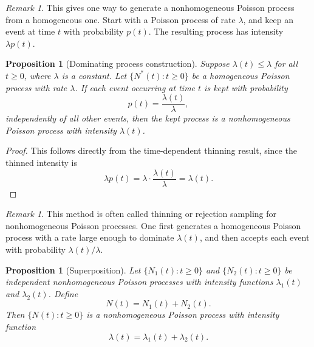 \documentclass[11pt]{article}
\theoremstyle{plain}
\newtheorem{proposition}[theorem]{Proposition}
\theoremstyle{definition}
\theoremstyle{remark}
\newtheorem{remark}[theorem]{Remark}
\begin{document}
	
	\begin{remark}
		This gives one way to generate a nonhomogeneous Poisson process from a homogeneous one. Start with a Poisson process of rate \(\lambda\), and keep an event at time \(t\) with probability \(p(t)\). The resulting process has intensity \(\lambda p(t)\).
	\end{remark}
	
	\begin{proposition}[Dominating process construction]
		Suppose \(\lambda(t)\le \lambda\) for all \(t\ge 0\), where \(\lambda\) is a constant. Let \(\{N^*(t):t\ge 0\}\) be a homogeneous Poisson process with rate \(\lambda\). If each event occurring at time \(t\) is kept with probability
		\[
		p(t)=\frac{\lambda(t)}{\lambda},
		\]
		independently of all other events, then the kept process is a nonhomogeneous Poisson process with intensity \(\lambda(t)\).
	\end{proposition}
	
	\begin{proof}
		This follows directly from the time-dependent thinning result, since the thinned intensity is
		\[
		\lambda p(t)=\lambda\cdot \frac{\lambda(t)}{\lambda}=\lambda(t).
		\]
	\end{proof}
	
	\begin{remark}
		This method is often called thinning or rejection sampling for nonhomogeneous Poisson processes. One first generates a homogeneous Poisson process with a rate large enough to dominate \(\lambda(t)\), and then accepts each event with probability \(\lambda(t)/\lambda\).
	\end{remark}
	
\begin{proposition}[Superposition]
	Let \(\{N_1(t):t\ge 0\}\) and \(\{N_2(t):t\ge 0\}\) be independent
	nonhomogeneous Poisson processes with intensity functions
	\(\lambda_1(t)\) and \(\lambda_2(t)\). Define
	\[
	N(t)=N_1(t)+N_2(t).
	\]
	Then \(\{N(t):t\ge 0\}\) is a nonhomogeneous Poisson process with
	intensity function
	\[
	\lambda(t)=\lambda_1(t)+\lambda_2(t).
	\]
\end{proposition}
\end{document}
